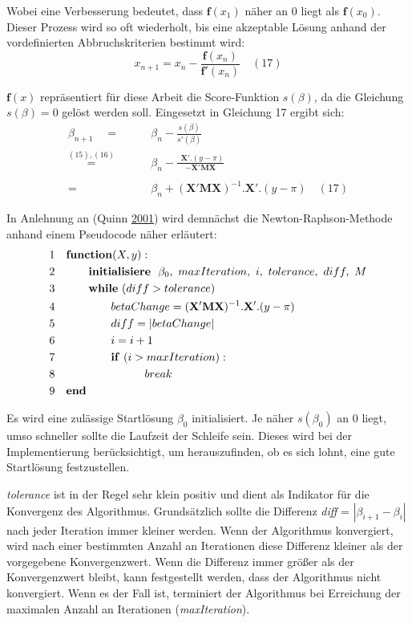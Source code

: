 \documentclass[12pt,]{article}
\begin{document}
Wobei eine Verbesserung bedeutet, dass \(\mathbf{f}(x_1)\) näher an 0
liegt als \(\mathbf{f}(x_0)\). Dieser Prozess wird so oft wiederholt,
bis eine akzeptable Lösung anhand der vordefinierten Abbruchskriterien
bestimmt wird: \[
x_{n+1} = x_n - \frac{\mathbf{f}(x_n)}{\mathbf{f'}(x_n)} \quad (17)
\]

\(\mathbf{f}(x)\) repräsentiert für diese Arbeit die Score-Funktion
\(s(\beta)\), da die Gleichung \(s(\beta) = 0\) gelöst werden soll.
Eingesetzt in Gleichung 17 ergibt sich: \[
\begin{aligned}
\beta_{n+1}\quad  = \qquad &\beta_n - \frac{s(\beta)}{s'(\beta)} \\
\mathrel{\overset{(15),(16)}{=}} \quad &\beta_n - \frac{\ \  \mathbf{X}'.(y-\pi)}{- \mathbf{X}'\mathbf{M}\mathbf{X}} \\ \\
= \qquad &\beta_n + (\mathbf{X}'\mathbf{M}\mathbf{X})^{-1}.\mathbf{X}'.(y-\pi) \quad (17)
\end{aligned} 
\]

In Anlehnung an (Quinn \protect\hyperlink{ref-quinn2001newton}{2001})
wird demnächst die Newton-Raphson-Methode anhand einem Pseudocode näher
erläutert: \[
\begin{aligned}
&1 \quad \mathbf{function}(X, y): \\
&2 \qquad \quad   \mathbf{initialisiere} \ \ \beta_0,\ maxIteration,\ i,\ tolerance,\ diff,\ M \\
&3 \qquad \quad  \mathbf{while} \ (diff > tolerance) \\
&4 \qquad \qquad \quad betaChange = (\mathbf{X}'\mathbf{M}\mathbf{X})^{-1}.\mathbf{X}'.(y-\pi) \\
&5 \qquad \qquad \quad diff = | betaChange| \\
&6 \qquad \qquad \quad      i = i + 1 \\
&7 \qquad \qquad \quad      \mathbf{if} \ (i > maxIteration): \\
&8  \qquad \qquad \qquad \qquad          break \\ 
&9 \quad \bf{end} 
\end{aligned}
\]

Es wird eine zulässige Startlösung \(\beta_0\) initialisiert. Je näher
\(s(\beta_0)\) an 0 liegt, umso schneller sollte die Laufzeit der
Schleife sein. Dieses wird bei der Implementierung berücksichtigt, um
herauszufinden, ob es sich lohnt, eine gute Startlösung festzustellen.

\emph{tolerance} ist in der Regel sehr klein positiv und dient als
Indikator für die Konvergenz des Algorithmus. Grundsätzlich sollte die
Differenz \emph{diff} = \(|\beta_{i+1} - \beta_i|\) nach jeder Iteration
immer kleiner werden. Wenn der Algorithmus konvergiert, wird nach einer
bestimmten Anzahl an Iterationen diese Differenz kleiner als der
vorgegebene Konvergenzwert. Wenn die Differenz immer größer als der
Konvergenzwert bleibt, kann festgestellt werden, dass der Algorithmus
nicht konvergiert. Wenn es der Fall ist, terminiert der Algorithmus bei
Erreichung der maximalen Anzahl an Iterationen (\emph{maxIteration}).
\end{document}
